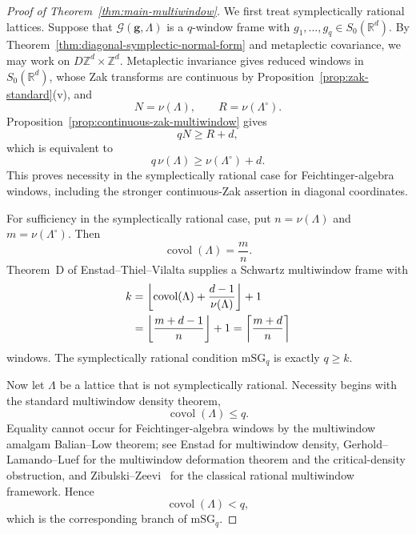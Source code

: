 \documentclass[11pt,reqno]{amsart}
\numberwithin{equation}{section}
\theoremstyle{definition}
\theoremstyle{remark}
\newcommand{\R}{\mathbb R}
\newcommand{\Z}{\mathbb Z}
\newcommand{\covol}{\operatorname{covol}}
\newcommand{\G}{\mathcal G}
\newcommand{\mSG}{\mathrm{mSG}}
\newcommand{\Szero}{S_0}
\begin{document}
\begin{proof}[Proof of Theorem~\ref{thm:main-multiwindow}]
We first treat symplectically rational lattices.  Suppose that
$\G(\mathbf g,\Lambda)$ is a $q$-window frame with
$g_1,\ldots,g_q\in\Szero(\R^d)$.  By
Theorem~\ref{thm:diagonal-symplectic-normal-form} and metaplectic covariance,
we may work on $D\Z^d\times\Z^d$.  Metaplectic invariance gives reduced
windows in $\Szero(\R^d)$, whose Zak transforms are continuous by Proposition~\ref{prop:zak-standard}(v), and
\[
                 N=\nu(\Lambda),
 \qquad
                 R=\nu(\Lambda^\circ).
\]
Proposition~\ref{prop:continuous-zak-multiwindow} gives
\[
             qN\ge R+d,
\]
which is equivalent to
\[
             q\,\nu(\Lambda)\ge\nu(\Lambda^\circ)+d.
\]
This proves necessity in the symplectically rational case for
Feichtinger-algebra windows, including the stronger continuous-Zak assertion in diagonal coordinates.

For sufficiency in the symplectically rational case, put
$n=\nu(\Lambda)$ and $m=\nu(\Lambda^\circ)$.  Then
\[
                         \covol(\Lambda)=\frac mn.
\]
Theorem~D of Enstad--Thiel--Vilalta
\cite{EnstadThielVilalta2025} supplies a Schwartz multiwindow frame with
\begin{align}
 k
 &=\left\lfloor
       \covol(\Lambda)+\frac{d-1}{\nu(\Lambda)}
    \right\rfloor+1 \notag\\
 &=\left\lfloor\frac{m+d-1}{n}\right\rfloor+1
  =\left\lceil\frac{m+d}{n}\right\rceil
 \label{eq:multiwindow-k-min}
\end{align}
windows.  The symplectically rational condition $\mSG_q$ is exactly $q\ge k$.

Now let $\Lambda$ be a lattice that is not symplectically rational.
Necessity begins with the standard
multiwindow density theorem,
\[
                         \covol(\Lambda)\le q.
\]
Equality cannot occur for Feichtinger-algebra windows by the multiwindow
amalgam Balian--Low theorem; see Enstad
\cite[Theorems~5.4--5.6]{Enstad2022Density} for multiwindow density,
Gerhold--Lamando--Luef
\cite[Theorem~3.38 and Corollary~3.39]{GerholdLamandoLuef2026} for the
multiwindow deformation theorem and the critical-density obstruction, and
Zibulski--Zeevi~\cite{ZibulskiZeevi1997} for the classical rational
multiwindow framework.
Hence
\[
                         \covol(\Lambda)<q,
\]
which is the corresponding branch of $\mSG_q$.


\end{proof}
\end{document}
